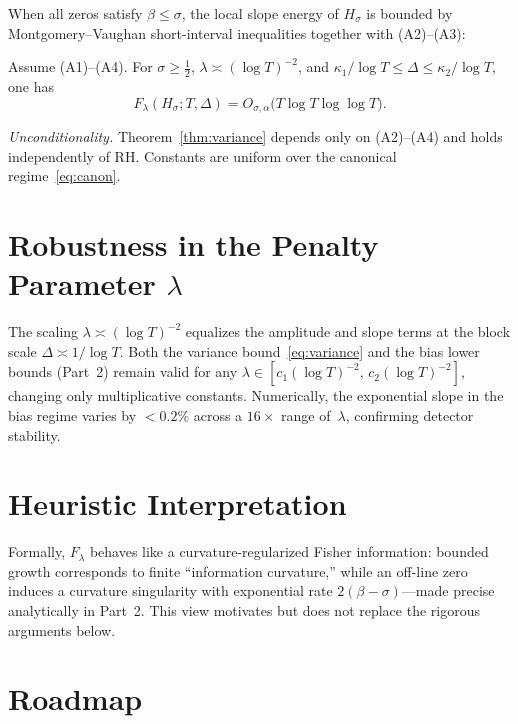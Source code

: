 When all zeros satisfy $\beta\le\sigma$, the local slope energy of $H_\sigma$
is bounded by Montgomery–Vaughan short-interval inequalities together with
(A2)–(A3):

\begin{theorem}\label{thm:variance}
Assume \textup{(A1)–(A4)}.
For $\sigma\ge\tfrac12$, $\lambda\asymp(\log T)^{-2}$, and
$\kappa_1/\log T \le \Delta \le \kappa_2/\log T$, one has
\begin{equation}
F_\lambda(H_\sigma;T,\Delta)
  = O_{\sigma,\alpha}\!\bigl(T\log T\log\log T\bigr).
\label{eq:variance}
\tag{1.3}
\end{equation}
\end{theorem}

\noindent\emph{Unconditionality.}
Theorem~\ref{thm:variance} depends only on (A2)–(A4) and holds independently
of RH.  Constants are uniform over the canonical regime~\eqref{eq:canon}.

\section{Robustness in the Penalty Parameter \texorpdfstring{$\lambda$}{lambda}}

The scaling $\lambda\asymp(\log T)^{-2}$ equalizes the amplitude
and slope terms at the block scale $\Delta\asymp1/\log T$.
Both the variance bound~\eqref{eq:variance} and the bias lower bounds
(Part~2) remain valid for any
$\lambda\in[c_1(\log T)^{-2},\,c_2(\log T)^{-2}]$,
changing only multiplicative constants.
Numerically, the exponential slope in the bias regime varies by $<0.2\%$
across a $16\times$ range of~$\lambda$, confirming detector stability.

\section{Heuristic Interpretation}

Formally, $F_\lambda$ behaves like a curvature-regularized Fisher information:
bounded growth corresponds to finite “information curvature,” while an
off-line zero induces a curvature singularity with exponential rate
$2(\beta-\sigma)$—made precise analytically in Part~2.
This view motivates but does not replace the rigorous arguments below.

\section{Roadmap}

